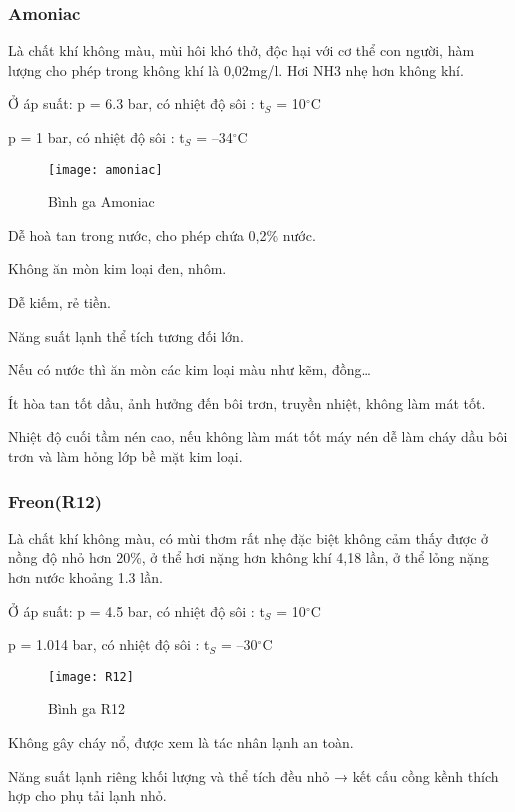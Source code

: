 \subsubsection{Amoniac}
Là chất khí không màu, mùi hôi khó thở, độc hại với cơ thể con người, hàm lượng cho phép trong không khí là 0,02mg/l. Hơi NH3 nhẹ hơn không khí.

Ở áp suất: 
\hspace{1cm}
p = 6.3 bar, có nhiệt độ sôi : t$_{S}$ = 10$^{\circ}$C

\hspace{2.95cm}
p = 1 bar, có nhiệt độ sôi : t$_{S}$ = –34$^{\circ}$C
\begin{figure}[H]
	\centering
	\texttt{[image: amoniac]}
	\caption{Bình ga Amoniac}
\end{figure}

Dễ hoà tan trong nước, cho phép chứa 0,2\% nước.

Không ăn mòn kim loại đen, nhôm.

Dễ kiếm, rẻ tiền.

Năng suất lạnh thể tích tương đối lớn.

Nếu có nước thì ăn mòn các kim loại màu như kẽm, đồng…

Ít hòa tan tốt dầu, ảnh hưởng đến bôi trơn, truyền nhiệt, không làm mát tốt.

Nhiệt độ cuối tầm nén cao, nếu không làm mát tốt máy nén dễ làm cháy dầu bôi trơn và làm hỏng lớp bề mặt kim loại.
\subsubsection{Freon(R12)}
Là chất khí không màu, có mùi thơm rất nhẹ đặc biệt không cảm thấy được ở nồng độ nhỏ hơn 20\%, ở thể hơi nặng hơn không khí 4,18 lần, ở thể lỏng nặng hơn nước khoảng 1.3 lần.

Ở áp suất: 
\hspace{1cm}
p = 4.5 bar, có nhiệt độ sôi : t$_{S}$ = 10$^{\circ}$C

\hspace{2.95cm}
p = 1.014 bar, có nhiệt độ sôi : t$_{S}$ = –30$^{\circ}$C
\begin{figure}[H]
	\centering
	\texttt{[image: R12]}
	\caption{Bình ga R12}
\end{figure}

Không gây cháy nổ, được xem là tác nhân lạnh an toàn.

Năng suất lạnh riêng khối lượng và thể tích đều nhỏ → kết cấu cồng kềnh thích hợp cho phụ tải lạnh nhỏ.


